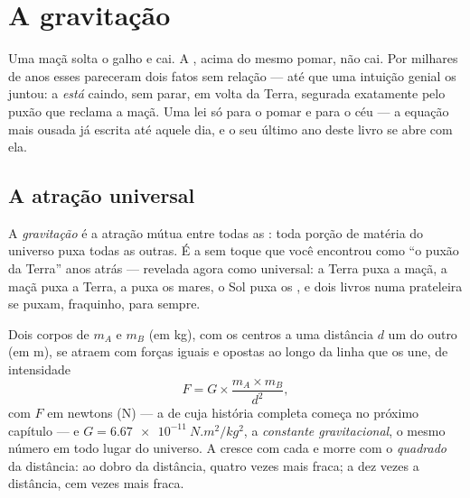 \chapter{A gravitação}\label{ch:g9:gravitation}

Uma maçã solta o galho e cai. A , acima do mesmo pomar, não cai.
Por milhares de anos esses pareceram dois fatos sem relação --- até
que uma intuição genial os juntou: a  \emph{está} caindo, sem
parar, em volta da Terra, segurada exatamente pelo puxão que reclama
a maçã. Uma lei só para o pomar e para o céu --- a equação mais ousada
já escrita até aquele dia, e o seu último ano deste livro se abre com
ela.

\section{A atração universal}

\begin{definition}[Gravitação]\label{def:g9:gravitation:gravitation}
A \emph{gravitação} é a atração mútua entre todas
as : toda porção de matéria do universo puxa todas as outras. É
a  sem toque que você encontrou como ``o puxão da Terra'' anos
atrás --- revelada agora como universal: a Terra puxa a maçã, a maçã
puxa a Terra, a  puxa os mares, o Sol puxa os , e dois
livros numa prateleira se puxam, fraquinho, para sempre.
\end{definition}

\begin{proposition}\label{prop:g9:gravitation:law}
Dois corpos de  $m_A$ e $m_B$ (em \unit{kg}), com os centros a
uma distância $d$ um do outro (em \unit{m}), se atraem com forças
iguais e opostas ao longo da linha que os une, de intensidade
\[
F = G \times \frac{m_A \times m_B}{d^2},
\]
com $F$ em newtons (\unit{N}) --- a  de  cuja história
completa começa no próximo capítulo --- e
$G = \qty{6.67e-11}{N.m^2/kg^2}$, a \emph{constante gravitacional}, o
mesmo número em todo lugar do universo. A  cresce com cada
 e morre com o \emph{quadrado} da distância: ao dobro da
distância, quatro vezes mais fraca; a dez vezes a distância, cem
vezes mais fraca.
\end{proposition}

